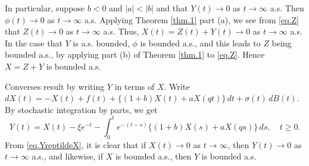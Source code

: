 \documentclass[a4paper,10pt,reqno]{amsart}
\numberwithin{equation}{section}
\theoremstyle{definition}
\theoremstyle{remark}
\DeclareMathOperator{\1}{\mathbbm 1}
\begin{document}
In particular, suppose $b<0$ and $|a|<|b|$ and that $Y(t)\to 0$ as $t\to\infty$ a.s. Then $\phi(t)\to 0$ as $t\to\infty$ a.s. Applying Theorem \ref{thm.1} part (a), we see from \eqref{eq.Z} that $Z(t)\to 0$ as $t\to\infty$ a.s. Thus, $X(t)=Z(t)+Y(t)\to 0$ as $t\to\infty$ a.s. In the case that $Y$ is a.s. bounded, $\phi$ is bounded a.s., and this leads to $Z$ being bounded a.s., by applying part (b) of Theorem \ref{thm.1} to \eqref{eq.Z}. Hence $X=Z+Y$ is bounded a.s. 


Converses result by writing $Y$ in terms of $X$. 
Write $dX(t)=-X(t)+ f(t)+\{(1+b)X(t)+aX(qt)\}\,dt + \sigma(t)\,dB(t)$. 
By stochastic integration by parts, we get    
\begin{equation}  \label{eq.YreptildeX}
Y(t)=X(t)-\xi e^{-t} - \int_0^t e^{-(t-s)}\{(1+b)X(s)+aX(qs)\}\,ds, \quad t\geq 0.
\end{equation}
From \eqref{eq.YreptildeX}, it is clear that if $X(t)\to 0$ as $t\to\infty$, then $Y(t)\to 0$ as $t\to\infty$ a.s., and likewise, if $X$ is bounded a.s., then $Y$ is bounded a.s. 
\end{document}

